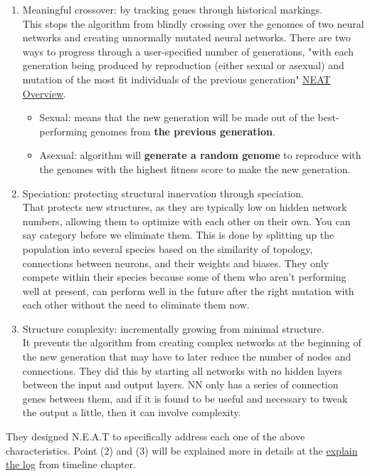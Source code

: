 \begin{enumerate} \label{list:3tweanns}
	\item Meaningful crossover: by tracking genes through historical markings.\\
This stops the algorithm from blindly crossing over the genomes of two neural networks and creating unnormally mutated neural networks. There are two ways to progress through a user-specified number of generations, "with each generation being produced by reproduction (either sexual or asexual) and mutation of the most fit individuals of the previous generation" \href{https://neat-python.readthedocs.io/en/latest/neat_overview.html}{NEAT Overview}.
	\begin{itemize}
		\item Sexual: means that the new generation will be made out of the best-performing genomes from \textbf{the previous generation}.
		\item Asexual: algorithm will \textbf{generate a random genome} to reproduce with the genomes with the highest fitness score to make the new generation.
	\end{itemize}
	
	\item Speciation: protecting structural innervation through speciation.\\
	That protects new structures, as they are typically low on hidden network numbers, allowing them to optimize with each other on their own. You can say category before we eliminate them. This is done by splitting up the population into several species based on the similarity of topology, connections between neurons, and their weights and biases. They only compete within their species because some of them who aren’t performing well at present, can perform well in the future after the right mutation with each other without the need to eliminate them now.
	\item Structure complexity: incrementally growing from minimal structure.\\
It prevents the algorithm from creating complex networks at the beginning of the new generation that may have to later reduce the number of nodes and connections. They did this by starting all networks with no hidden layers between the input and output layers. NN only has a series of connection genes between them, and if it is found to be useful and necessary to tweak the output a little, then it can involve complexity.
\end{enumerate}

They designed N.E.A.T to specifically address each one of the above characteristics. Point (2) and (3) will be explained more in details at the \hyperref[sec:explain-the-log]{explain the log} from timeline chapter.



